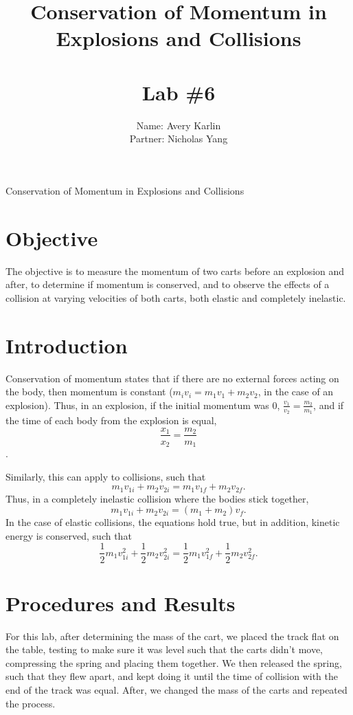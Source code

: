 \documentclass[11pt, titlepage]{article}
\title{Conservation of Momentum in Explosions and Collisions\\ \ \\ \large Lab \#6}
\author{Name: Avery Karlin \\ Partner: Nicholas Yang}
\date{}
\begin{document}
\maketitle

\begin{center}
\LARGE Conservation of Momentum in Explosions and Collisions
\end{center}

\section*{Objective}
The objective is to measure the momentum of two carts before an explosion and after, to determine if momentum is conserved, and to observe the effects of a collision at varying velocities of both carts, both elastic and completely inelastic.

\section*{Introduction}
Conservation of momentum states that if there are no external forces acting on the body, then momentum is constant ($m_iv_i = m_1v_1 + m_2v_2$, in the case of an explosion). Thus, in an explosion, if the initial momentum was 0, $\frac{v_1}{v_2} = \frac{m_2}{m_1}$, and if the time of each body from the explosion is equal, $$\frac{x_1}{x_2} = \frac{m_2}{m_1}$$.

Similarly, this can apply to collisions, such that $$m_1v_{1i} + m_2v_{2i} = m_1v_{1f} + m_2v_{2f}.$$ Thus, in a completely inelastic collision where the bodies stick together, $$m_1v_{1i} + m_2v_{2i} = (m_1 + m_2)v_f.$$ In the case of elastic collisions, the equations hold true, but in addition, kinetic energy is conserved, such that $$\frac{1}{2}m_1v_{1i}^2 + \frac{1}{2}m_2v_{2i}^2 = \frac{1}{2}m_1v_{1f}^2 + \frac{1}{2}m_2v_{2f}^2.$$ 

\section*{Procedures and Results}
For this lab, after determining the mass of the cart, we placed the track flat on the table, testing to make sure it was level such that the carts didn't move, compressing the spring and placing them together. We then released the spring, such that they flew apart, and kept doing it until the time of collision with the end of the track was equal. After, we changed the mass of the carts and repeated the process.
\end{document}
